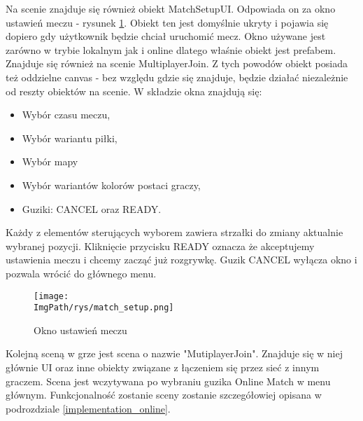 \documentclass[a4paper,12pt,twoside,openany]{report}
\newcommand{\ImgPath}{.}
\begin{document}
Na scenie znajduje się również obiekt MatchSetupUI. Odpowiada on za okno ustawień meczu - rysunek \ref{match_setup}. Obiekt ten  jest domyślnie ukryty i pojawia się dopiero gdy użytkownik będzie chciał uruchomić mecz. Okno używane jest zarówno w trybie lokalnym jak i online dlatego właśnie obiekt jest prefabem. Znajduje się również na scenie MultiplayerJoin. Z tych powodów obiekt posiada też oddzielne canvas - bez względu gdzie się znajduje, będzie działać niezależnie od reszty obiektów na scenie. W składzie okna znajdują się:
\begin{itemize}
    \item Wybór czasu meczu,
    \item Wybór wariantu piłki,
    \item Wybór mapy
    \item Wybór wariantów kolorów postaci graczy,
    \item Guziki: CANCEL oraz READY.
\end{itemize}
Każdy z elementów sterujących wyborem zawiera strzałki do zmiany aktualnie wybranej pozycji. Kliknięcie przycisku READY oznacza że akceptujemy ustawienia meczu i chcemy zacząć już rozgrywkę. Guzik CANCEL wyłącza okno i pozwala wrócić do głównego menu.

\begin{figure}[H]
	\begin{center}
\centering
\texttt{[image: \\ImgPath/rys/match\_setup.png]}
\end{center}
	\caption{Okno ustawień meczu}
	\label{match_setup}
\end{figure}



Kolejną sceną w grze jest scena o nazwie "MutiplayerJoin". Znajduje się w niej głównie UI oraz inne obiekty związane z łączeniem się przez sieć z innym graczem. Scena jest wczytywana po wybraniu guzika Online Match w menu głównym. Funkcjonalność zostanie sceny zostanie szczegółowiej opisana w podrozdziale \ref{implementation_online}.
\end{document}
